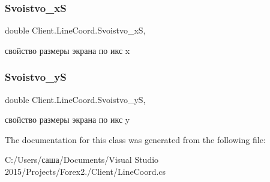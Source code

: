 \subsubsection{\texorpdfstring{Svoistvo\+\_\+xS}{Svoistvo\_xS}}
{\footnotesize\ttfamily double Client.\+Line\+Coord.\+Svoistvo\+\_\+xS\hspace{0.3cm}{\ttfamily [get]}, {\ttfamily [set]}}



свойство размеры экрана по икс x 

\hypertarget{class_client_1_1_line_coord_a71bf6f4176e9f7becd572f44f1d4948f}{}\label{class_client_1_1_line_coord_a71bf6f4176e9f7becd572f44f1d4948f} 
\subsubsection{\texorpdfstring{Svoistvo\+\_\+yS}{Svoistvo\_yS}}
{\footnotesize\ttfamily double Client.\+Line\+Coord.\+Svoistvo\+\_\+yS\hspace{0.3cm}{\ttfamily [get]}, {\ttfamily [set]}}



свойство размеры экрана по икс y 



The documentation for this class was generated from the following file\+:\begin{DoxyCompactItemize}
\item 
C\+:/\+Users/саша/\+Documents/\+Visual Studio 2015/\+Projects/\+Forex2./\+Client/Line\+Coord.\+cs\end{DoxyCompactItemize}
